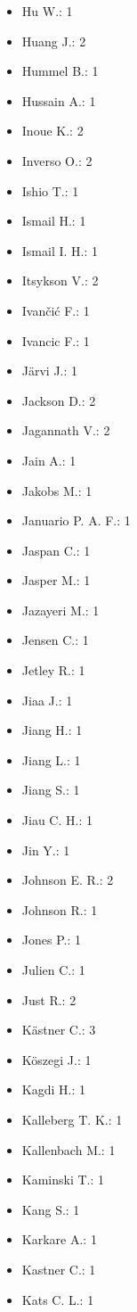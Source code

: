 \begin{itemize}
\item Hu W.: 1
\item Huang J.: 2
\item Hummel B.: 1
\item Hussain A.: 1
\item Inoue K.: 2
\item Inverso O.: 2
\item Ishio T.: 1
\item Ismail H.: 1
\item Ismail I. H.: 1
\item Itsykson V.: 2
\item Ivan\v{c}i\'{c} F.: 1
\item Ivancic F.: 1
\item J\"{a}rvi J.: 1
\item Jackson D.: 2
\item Jagannath V.: 2
\item Jain A.: 1
\item Jakobs M.: 1
\item Januario P. A. F.: 1
\item Jaspan C.: 1
\item Jasper M.: 1
\item Jazayeri M.: 1
\item Jensen C.: 1
\item Jetley R.: 1
\item Jiaa J.: 1
\item Jiang H.: 1
\item Jiang L.: 1
\item Jiang S.: 1
\item Jiau C. H.: 1
\item Jin Y.: 1
\item Johnson E. R.: 2
\item Johnson R.: 1
\item Jones P.: 1
\item Julien C.: 1
\item Just R.: 2
\item K\"{a}stner C.: 3
\item K\"{o}szegi J.: 1
\item Kagdi H.: 1
\item Kalleberg T. K.: 1
\item Kallenbach M.: 1
\item Kaminski T.: 1
\item Kang S.: 1
\item Karkare A.: 1
\item Kastner C.: 1
\item Kats C. L.: 1

\end{itemize}
